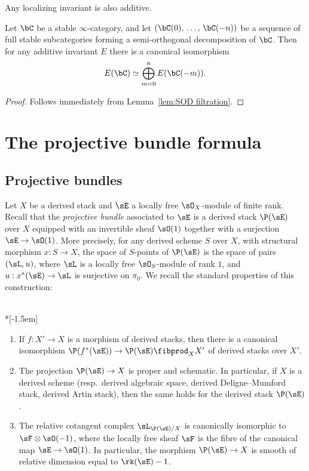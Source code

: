 \begin{rema}
Any localizing invariant is also additive.
\end{rema}

\begin{lemm}\label{lem:additive}
Let $\bC$ be a stable $\infty$-category, and let $(\bC(0),\,\ldots,\,\bC(-n))$ be a sequence of full stable subcategories forming a semi-orthogonal decomposition of $\bC$. Then for any additive invariant $E$ there is a canonical isomorphism
\[
E(\bC) \simeq \bigoplus_{m=0}^n E(\bC(-m)).
\]
\end{lemm}

\begin{proof}
Follows immediately from Lemma~\ref{lem:SOD filtration}.
\end{proof}

\section{The projective bundle formula}\label{sec:proj}

\subsection{Projective bundles}\label{ssec:proj/proj}

Let $X$ be a derived stack and $\sE$ a locally free $\sO_X$-module of finite rank. Recall that the \emph{projective bundle} associated to $\sE$ is a derived stack $\P(\sE)$ over $X$ equipped with an invertible sheaf $\sO(1)$ together with a surjection $\sE \to \sO(1)$. More precisely, for any derived scheme $S$ over $X$, with structural morphism $x : S \to X$, the space of $S$-points of $\P(\sE)$ is the space of pairs $(\sL, u)$, where $\sL$ is a locally free $\sO_S$-module of rank $1$, and $u : x^*(\sE) \to \sL$ is surjective on $\pi_0$. We recall the standard properties of this construction:

\begin{prop} \ \\*[-1.5em]
\begin{enumerate}\romanenumi
\item If $f : X' \to X$ is a morphism of derived stacks, then there is a canonical isomorphism $\P(f^*(\sE)) \to \P(\sE) \fibprod_X X'$ of derived stacks over $X'$.
\item The projection $\P(\sE)\to X$ is proper and schematic. In particular, if $X$ is a derived scheme (resp.~derived algebraic space, derived Deligne--Mumford stack, derived Artin stack), then the same holds for the derived stack $\P(\sE)$.
\item The relative cotangent complex $\sL_{\P(\sE)/X}$ is canonically isomorphic to $\sF \otimes \sO(-1)$, where the locally free sheaf $\sF$ is the fibre of the canonical map $\sE \to \sO(1)$. In particular, the morphism $\P(\sE) \to X$ is smooth of relative dimension equal to $\rk(\sE) - 1$.
\end{enumerate}
\end{prop}

